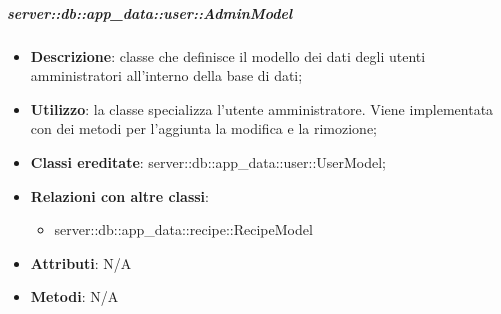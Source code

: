 		\subparagraph{server::db::app\_data::user::AdminModel} %
		\label{subp:server_db_app_data_user_admin_model}
			\begin{itemize}
				\item \textbf{Descrizione}: classe che definisce il modello dei dati degli utenti amministratori all'interno della base di dati;
				\item \textbf{Utilizzo}: la classe specializza l'utente amministratore. Viene implementata con dei metodi per l'aggiunta la modifica e la rimozione;
				\item \textbf{Classi ereditate}: server::db::app\_data::user::UserModel;
				\item \textbf{Relazioni con altre classi}:
					\begin{itemize}
						\item server::db::app\_data::recipe::RecipeModel
					\end{itemize}
				\item \textbf{Attributi}: N/A
				\item \textbf{Metodi}: N/A
			\end{itemize}


